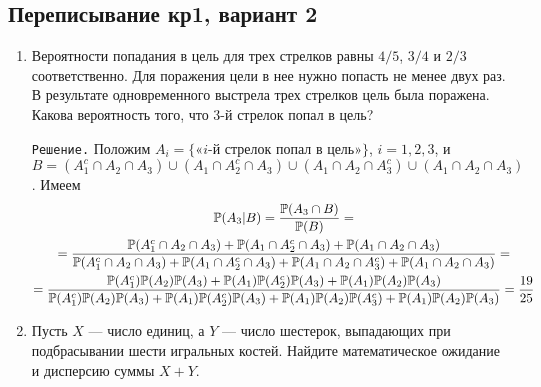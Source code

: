 \subsection{Переписывание кр1, вариант 2}
\begin{enumerate}
\item %
Вероятности попадания в цель для трех стрелков равны $4/5$, $3/4$ и $2/3$ соответственно. Для поражения цели в нее нужно попасть не менее двух раз. В результате одновременного выстрела трех стрелков цель была поражена. Какова вероятность того, что 3-й стрелок попал в цель?

\verb"Решение." Положим $A_i = \{\text{«$i$-й стрелок попал в цель»}\}$, $i = 1,2,3$, и $B = (A_1^c \cap A_2 \cap A_3) \cup (A_1 \cap A_2^c \cap A_3) \cup (A_1 \cap A_2 \cap A_3^c) \cup (A_1 \cap A_2 \cap A_3)$. Имеем
\begin{multline*}
\P(A_3|B) = \frac{\P(A_3 \cap B)}{\P(B)} = \\
= \frac{\P(A_1^c \cap A_2 \cap A_3) + \P(A_1 \cap A_2^c \cap A_3) + \P(A_1 \cap A_2 \cap A_3)}{\P(A_1^c \cap A_2 \cap A_3) + \P(A_1 \cap A_2^c \cap A_3) + \P(A_1 \cap A_2 \cap A_3^c) + \P(A_1 \cap A_2 \cap A_3)} = \\
= \frac{\P(A_1^c)\P(A_2)\P(A_3) + \P(A_1)\P(A_2^c)\P(A_3) + \P(A_1)\P(A_2)\P(A_3)}{\P(A_1^c)\P(A_2)\P(A_3) + \P(A_1)\P(A_2^c)\P(A_3) + \P(A_1)\P(A_2)\P(A_3^c) + \P(A_1)\P(A_2)\P(A_3)} = \frac{19}{25}
\end{multline*}
\item %
Пусть $X$ — число единиц, а $Y$ — число шестерок, выпадающих при подбрасывании шести игральных костей. Найдите математическое ожидание и дисперсию суммы $X+Y$.


\end{enumerate}
